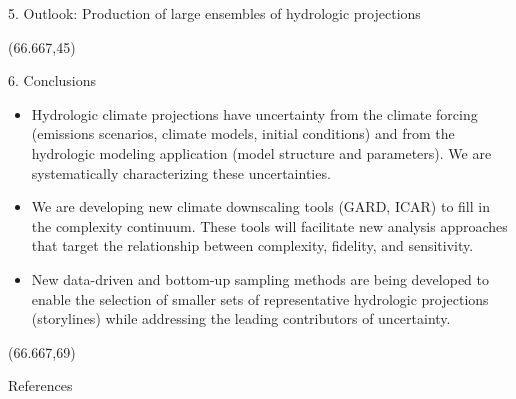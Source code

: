 \documentclass{beamer}
\begin{document}
\begin{frame}{}
\begin{columns}
\begin{column}{.3333\paperwidth}
\begin{textblock}{\textwidth \TPHorizModule}
\begin{block}{5. Outlook: Production of large ensembles of hydrologic projections}
    \end{block}
   \end{textblock}

   \begin{textblock}{\textwidth \TPHorizModule}(66.667,45)


    \begin{block}{6. Conclusions}

     \begin{shaded}

      \begin{itemize}         \vspace{1cm}
       \justifying
       \item Hydrologic climate projections have uncertainty from the climate forcing (emissions scenarios, climate models, initial conditions) and from the hydrologic modeling application (model structure and parameters). We are systematically characterizing these uncertainties. \vspace{1cm}
       \item We are developing new climate downscaling tools (GARD, ICAR) to fill in the complexity continuum. These tools will facilitate new analysis approaches that target the relationship between complexity, fidelity, and sensitivity. \vspace{1cm}
       \item New data-driven and bottom-up sampling methods are being developed to enable the selection of smaller sets of representative hydrologic projections (storylines) while addressing the leading contributors of uncertainty. \vspace{1cm}

      \end{itemize}

     \end{shaded}



    \end{block}
   \end{textblock}

   \vspace{2cm}

   \begin{textblock}{\textwidth \TPHorizModule}(66.667,69)
    \begin{block}{References}


     \justifying
     

     \small %

    \end{block}
   \end{textblock}


  \end{column}
 \end{columns}
\end{frame}
\end{document}
